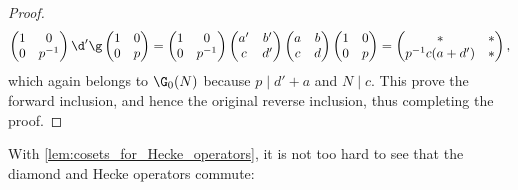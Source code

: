 \begin{proof}
\[        \begin{pmatrix} 1 & 0 \\ 0 & p^{-1} \end{pmatrix}\d'\g\begin{pmatrix} 1 & 0 \\ 0 & p \end{pmatrix} = \begin{pmatrix} 1 & 0 \\ 0 & p^{-1} \end{pmatrix}\begin{pmatrix} a' & b' \\ c & d' \end{pmatrix}\begin{pmatrix} a & b \\ c & d \end{pmatrix}\begin{pmatrix} 1 & 0 \\ 0 & p \end{pmatrix} = \begin{pmatrix} \ast & \ast \\ p^{-1}c(a+d') & \ast \end{pmatrix},
      \]
      which again belongs to $\G_{0}(N)$ because $p \mid d'+a$ and $N \mid c$. This prove the forward inclusion, and hence the original reverse inclusion, thus completing the proof.
    \end{proof}
    
    With \cref{lem:cosets_for_Hecke_operators}, it is not too hard to see that the diamond and Hecke operators commute:

